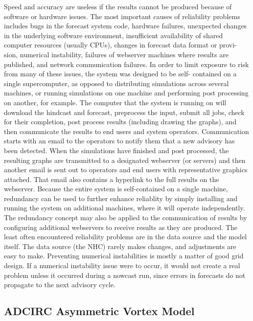 \documentclass[12pt]{article}
\begin{document}
Speed and accuracy are useless if the results cannot be produced 
because of software or hardware issues. The most important causes of 
reliability problems includes bugs in the forecast system code, 
hardware failures, unexpected changes in the underlying software 
environment, insufficient availability of shared computer resources 
(usually CPUs), changes in forecast data format or provi- sion, 
numerical instability, failures of webserver machines where results 
are published, and network communication failures. In order to limit 
exposure to risk from many of these issues, the system was designed 
to be self- contained on a single supercomputer, as opposed to 
distributing simulations across several machines, or running 
simulations on one machine and performing post processing on 
another, for example. The computer that the system is running on 
will download the hindcast and forecast, preprocess the input, 
submit all jobs, check for their completion, post process results 
(including drawing the graphs), and then communicate the results to 
end users and system operators. Communication starts with an email 
to the operators to notify them that a new advisory has been 
detected. When the simulations have finished and post processed, the 
resulting graphs are transmitted to a designated webserver (or 
servers) and then another email is sent out to operators and end 
users with representative graphics attached. That email also 
contains a hyperlink to the full results on the webserver. Because 
the entire system is self-contained on a single machine, redundancy 
can be used to further enhance reliablity by simply installing and 
running the system on additional machines, where it will operate 
independently. The redundancy concept may also be applied to the 
communication of results by configuring additional webservers to 
receive results as they are produced. The least often encountered 
reliability problems are in the data source and the model itself. 
The data source (the NHC) rarely makes changes, and adjustments are 
easy to make. Preventing numerical instabilities is mostly a matter 
of good grid design. If a numerical instability issue were to occur, 
it would not create a real problem unless it occurred during a 
nowcast run, since errors in forecasts do not propagate to the next 
advisory cycle.

\subsection{ADCIRC Asymmetric Vortex Model}
\end{document}
